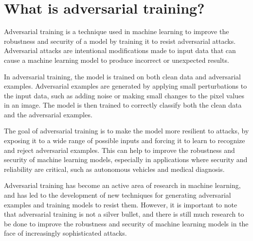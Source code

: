 \section{What is adversarial training?}
Adversarial training is a technique used in machine learning to improve the robustness and security of a model by training it to resist adversarial attacks. Adversarial attacks are intentional modifications made to input data that can cause a machine learning model to produce incorrect or unexpected results.

In adversarial training, the model is trained on both clean data and adversarial examples. Adversarial examples are generated by applying small perturbations to the input data, such as adding noise or making small changes to the pixel values in an image. The model is then trained to correctly classify both the clean data and the adversarial examples.

The goal of adversarial training is to make the model more resilient to attacks, by exposing it to a wide range of possible inputs and forcing it to learn to recognize and reject adversarial examples. This can help to improve the robustness and security of machine learning models, especially in applications where security and reliability are critical, such as autonomous vehicles and medical diagnosis.

Adversarial training has become an active area of research in machine learning, and has led to the development of new techniques for generating adversarial examples and training models to resist them. However, it is important to note that adversarial training is not a silver bullet, and there is still much research to be done to improve the robustness and security of machine learning models in the face of increasingly sophisticated attacks.

